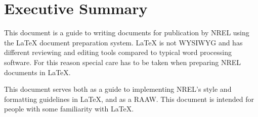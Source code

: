 \chapter*{Executive Summary}
This document is a guide to writing documents for publication by NREL using the LaTeX document preparation system. LaTeX is not WYSIWYG and has different reviewing and editing tools compared to typical word processing software. For this reason special care has to be taken when preparing NREL documents in LaTeX. 

This document serves both as a guide to implementing NREL's style and formatting guidelines in LaTeX, and as a RAAW. This document is intended for people with some familiarity with LaTeX.
